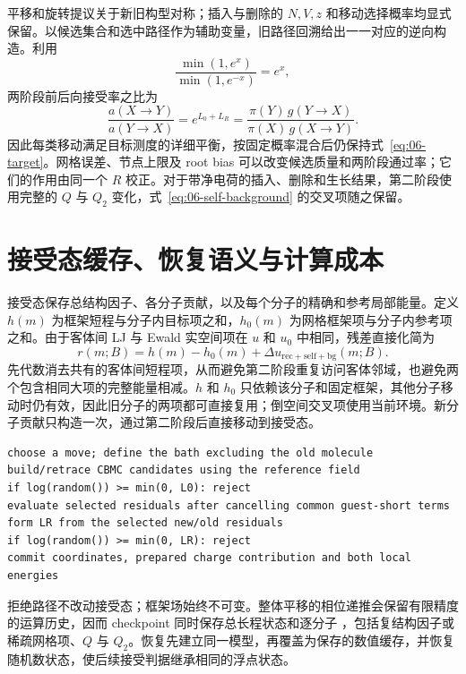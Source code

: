 平移和旋转提议关于新旧构型对称；插入与删除的 $N,V,z$ 和移动选择概率均显式保留。以候选集合和选中路径作为辅助变量，旧路径回溯给出一一对应的逆向构造。利用
\begin{equation}
\frac{\min(1,e^x)}{\min(1,e^{-x})}=e^x,
\end{equation}
两阶段前后向接受率之比为
\begin{equation}
\frac{a(X\to Y)}{a(Y\to X)}
=e^{L_0+L_R}
=\frac{\pi(Y)\,g(Y\to X)}{\pi(X)\,g(X\to Y)}.
\label{eq:06-detailed-balance}
\end{equation}
因此每类移动满足目标测度的详细平衡，按固定概率混合后仍保持式~\eqref{eq:06-target}。网格误差、节点上限及 root bias 可以改变候选质量和两阶段通过率；它们的作用由同一个 $R$ 校正。对于带净电荷的插入、删除和生长结果，第二阶段使用完整的 $Q$ 与 $Q_2$ 变化，式~\eqref{eq:06-self-background} 的交叉项随之保留。

\section{接受态缓存、恢复语义与计算成本}
\label{sec:06-execution}

接受态保存总结构因子、各分子贡献，以及每个分子的精确和参考局部能量。定义 $h(m)$ 为框架短程与分子内目标项之和，$h_0(m)$ 为网格框架项与分子内参考项之和。由于客体间 LJ 与 Ewald 实空间项在 $u$ 和 $u_0$ 中相同，残差直接化简为
\begin{equation}
r(m;B)=h(m)-h_0(m)+\Delta u_{\mathrm{rec+self+bg}}(m;B).
\label{eq:06-cancel-common}
\end{equation}
 先代数消去共有的客体间短程项，从而避免第二阶段重复访问客体邻域，也避免两个包含相同大项的完整能量相减。$h$ 和 $h_0$ 只依赖该分子和固定框架，其他分子移动时仍有效，因此旧分子的两项都可直接复用；倒空间交叉项使用当前环境。新分子贡献只构造一次，通过第二阶段后直接移动到接受态。

\begin{lstlisting}[basicstyle=\ttfamily\small]
choose a move; define the bath excluding the old molecule
build/retrace CBMC candidates using the reference field
if log(random()) >= min(0, L0): reject
evaluate selected residuals after cancelling common guest-short terms
form LR from the selected new/old residuals
if log(random()) >= min(0, LR): reject
commit coordinates, prepared charge contribution and both local energies
\end{lstlisting}

拒绝路径不改动接受态；框架场始终不可变。整体平移的相位递推会保留有限精度的运算历史，因而 checkpoint 同时保存总长程状态和逐分子 ，包括复结构因子或稀疏网格项、$Q$ 与 $Q_2$。恢复先建立同一模型，再覆盖为保存的数值缓存，并恢复随机数状态，使后续接受判据继承相同的浮点状态。

